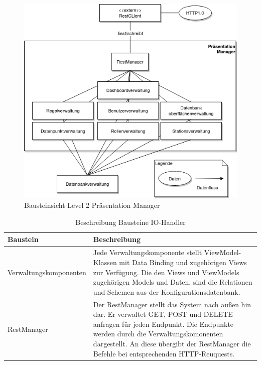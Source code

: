 \begin{figure}[h]
\centering
\includegraphics[width=1\textwidth]{Graphics/bausteinansicht_ebene_2_PrasentationManager.png}
\caption{Bausteinsicht Level 2 Pr\"asentation Manager}
\label{fig:bausteinsichtlvl2_modulIO}
\end{figure}                 

\begin{table}[th]
	\begin{tabularx}{\textwidth}{|p{5cm}|X|}
		\hline
		Baustein & Beschreibung\\
		\hline
		Verwaltungskomponenten & Jede Verwaltungskomponente stellt ViewModel-Klassen mit Data Binding und zugehörigen Views zur Verfügung. Die den Views und ViewModels zugehörigen Models und Daten, sind die Relationen und Schemen aus der Konfigurationsdatenbank. \\
		\hline
		RestManager &  Der RestManager stellt das System nach außen hin dar. Er verwaltet GET, POST und DELETE anfragen für jeden Endpunkt. Die Endpunkte werden durch die Verwaltungskomonenten dargestellt. An diese übergibt der RestManager die Befehle bei entsprechenden HTTP-Reuquests.\\
		\hline
	\end{tabularx} 
	\caption{Beschreibung Bausteine IO-Handler}	\label{tab:IOHandlerBeschreibung}
\end{table}